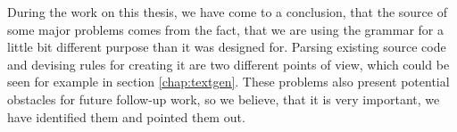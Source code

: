 During the work on this thesis, we have come to a conclusion, that the source of some major problems comes from the fact, that we are using the grammar for a little bit different purpose than it was designed for.
Parsing existing source code and devising rules for creating it are two different points of view, which could be seen for example in section \ref{chap:textgen}.
These problems also present potential obstacles for future follow-up work, so we believe, that it is very important, we have identified them and pointed them out.
